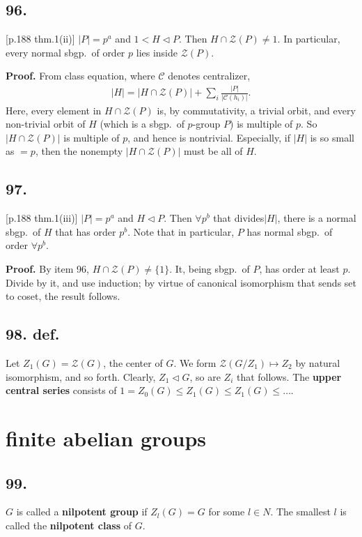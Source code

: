 \documentclass[12pt]{article}
\newcommand\F\frac%
\newcommand\Ev\forall%
\newcommand\Mp\mapsto%
\newcommand{\CF}[1]{ \mathcal{#1} }%
\newcommand{\SF}[1]{ \mathscr{#1} }%
\newcommand{\Ss}[1]{\textsf{\textbf{#1}}}%
\newcommand{\EqGo}[1]{ \begin{gather*}{#1}\end{gather*} } %
\begin{document}
\subsection*{96.} [p.188 thm.1(ii)] \(|P|=p^a\) and \(1< H \lhd P\). 
Then \(H \cap \SF Z(P) \neq 1\). 
In particular, every normal sbgp.\ of order \(p\) lies inside \(\SF Z(P)\). \par
\Ss{Proof.} From class equation, where \(\CF C\) denotes centralizer, \EqGo{
 |H|= |H \cap \SF Z(P)| + \sum_i \F{|P|}{|\CF C(h_i)|}.
} Here, every element in \(H \cap \SF Z(P)\) is, by commutativity, a trivial orbit, 
and every non-trivial orbit of \(H\) (which is a sbgp.\ of \(p\)-group \(P\)) is multiple of \(p\). 
So \(|H \cap \SF Z(P)|\) is multiple of \(p\), 
and hence is nontrivial. 
Especially, if \(|H|\) is so small as \(=p\), then the nonempty \(|H \cap \SF Z(P)|\) must be all of \(H\). 

\subsection*{97.} [p.188 thm.1(iii)] \(|P|=p^a\) and \(H \lhd P\). 
Then \(\Ev p^b\) that divides\(|H|\), there is a normal sbgp.\ of \(H\) that has order \(p^b\). 
Note that in particular, \(P\) has normal sbgp.\ of order \(\Ev p^b\). \par
\Ss{Proof.} By item 96, \(H \cap \SF Z(P) \neq \{1\}\). 
It, being sbgp.\ of \(P\), has order at least \(p\). 
Divide by it, and use induction; 
by virtue of canonical isomorphism that sends set to coset, the result follows. 

\subsection*{98. def.} Let \(Z_1(G) = \SF Z(G)\), the center of \(G\). 
We form \(\SF Z(G/Z_1) \Mp Z_2\) by natural isomorphism, and so forth. 
Clearly, \(Z_1 \lhd G\), so are \(Z_i\) that follows. 
The \Ss{upper central series} consists of \(1= Z_0(G) \leq Z_1(G) \leq  Z_1(G) \leq\dotsc\). 

\section{finite abelian groups}
\subsection*{99.} \(G\) is called a \Ss{nilpotent group} if \(Z_l(G) = G\) for some \(l \in N\). 
The smallest \(l\) is called the \Ss{nilpotent class} of \(G\). \par
\end{document}
